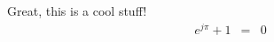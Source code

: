 \documentclass{article}
\begin{document}
Great, this is a cool stuff!
\begin{eqnarray}
  \label{eqn:simple}
  e^{j\pi} + 1 &=& 0
\end{eqnarray}
\end{document}

